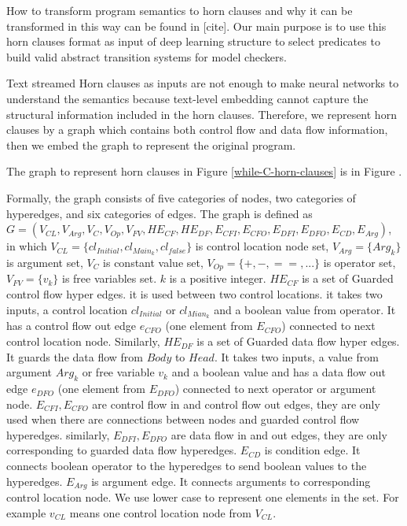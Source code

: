 \documentclass{article}
\begin{document}
How to transform program semantics to horn clauses and why it can be transformed in this way can be found in [cite]. Our main purpose is to use this horn clauses format as input of deep learning structure to select predicates to build valid abstract transition systems for model checkers. 

Text streamed Horn clauses as inputs are not enough to make neural networks to understand the semantics because text-level embedding cannot capture the structural information included in the horn clauses. Therefore, we represent horn clauses by a graph which contains both control flow and data flow information, then we embed the graph to represent the original program.

The graph to represent horn clauses in Figure \ref{while-C-horn-clauses} is in Figure .


Formally, the graph consists of five categories of nodes, two categories of hyperedges, and six categories of edges. The graph is defined as $G=(V_{CL},V_{Arg},V_{C},V_{Op},V_{FV},HE_{CF},HE_{DF},E_{CFI},E_{CFO},E_{DFI},E_{DFO},E_{CD},E_{Arg})$, in which $V_{CL}=\{cl_{Initial},cl_{Main_{k}},cl_{false}\}$ is control location node set, $V_{Arg}=\{Arg_{k}\}$ is argument set, $V_{C}$ is constant value set, $V_{Op}=\{+,-,==,...\}$ is operator set,$V_{FV}=\{v_{k}\}$ is free variables set. $k$ is a positive integer. $HE_{CF}$ is a set of Guarded control flow hyper edges. it is used between two control locations. it takes two inputs, a control location $cl_{Initial}$ or $cl_{Mian_{k}}$ and a boolean value from operator. It has a control flow out edge $e_{CFO}$ (one element from $E_{CFO}$) connected to next control location node. Similarly, $HE_{DF}$ is a set of Guarded data flow hyper edges. It guards the data flow from $Body$ to $Head$. It takes two inputs, a value from argument $Arg_{k}$ or free variable $v_{k}$ and a boolean value and has a data flow out edge $e_{DFO}$ (one element from $E_{DFO}$) connected to next operator or argument node. $E_{CFI},E_{CFO}$ are control flow in and control flow out edges, they are only used when there are connections between nodes and guarded control flow hyperedges. similarly, $E_{DFI},E_{DFO}$ are data flow in and out edges, they are only corresponding to guarded data flow hyperedges. $E_{CD}$ is condition edge. It connects boolean operator to the hyperedges to send boolean values to the hyperedges. $E_{Arg}$ is argument edge. It connects arguments to corresponding control location node. We use lower case to represent one elements in the set. For example $v_{CL}$ means one control location node from $V_{CL}$.
\end{document}
